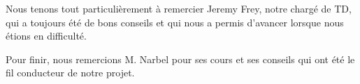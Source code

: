 \begin{thanks_perso}
Nous tenons tout particulièrement à remercier Jeremy Frey, notre chargé de TD, qui a toujours été de bons conseils et qui nous a permis d’avancer lorsque nous étions en difficulté.

Pour finir, nous remercions M. Narbel pour ses cours et ses conseils qui ont été le fil conducteur de notre projet.
\end{thanks_perso}